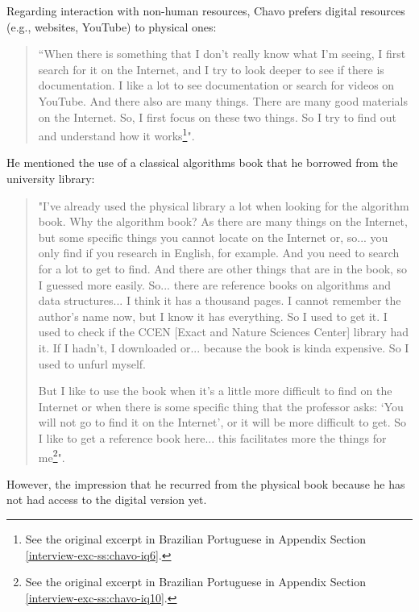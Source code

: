Regarding interaction with non-human resources, Chavo prefers digital resources (e.g., websites, YouTube) to physical ones:
\begin{quote}
    “When there is something that I don't really know what I'm seeing, I first search for it on the Internet, and I try to look deeper to see if there is documentation. I like a lot to see documentation or search for videos on YouTube. And there also are many things. There are many good materials on the Internet. So, I first focus on these two things. So I try to find out and understand how it works\footnote{See the original excerpt in Brazilian Portuguese in Appendix Section \ref{interview-exc-ss:chavo-iq6}.}".
\end{quote}
He mentioned the use of a classical algorithms book that he borrowed from the university library:
\begin{quote}
    "I've already used the physical library a lot when looking for the algorithm book. Why the algorithm book? As there are many things on the Internet, but some specific things you cannot locate on the Internet or, so... you only find if you research in English, for example. And you need to search for a lot to get to find. And there are other things that are in the book, so I guessed more easily. So... there are reference books on algorithms and data structures... I think it has a thousand pages. I cannot remember the author's name now, but I know it has everything. So I used to get it. I used to check if the CCEN [Exact and Nature Sciences Center] library had it. If I hadn't, I downloaded or... because the book is kinda expensive. So I used to unfurl myself. 

    But I like to use the book when it's a little more difficult to find on the Internet or when there is some specific thing that the professor asks: `You will not go to find it on the Internet', or it will be more difficult to get. So I like to get a reference book here... this facilitates more the things for me\footnote{See the original excerpt in Brazilian Portuguese in Appendix Section \ref{interview-exc-ss:chavo-iq10}.}".
\end{quote}
However, the impression that he recurred from the physical book because he has not had access to the digital version yet.

